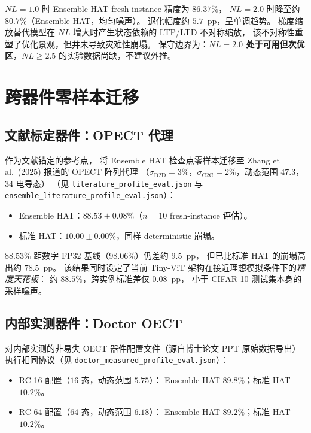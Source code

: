 $NL=1.0$ 时 Ensemble HAT fresh-instance 精度为 $86.37\%$，
$NL=2.0$ 时降至约 $80.7\%$（Ensemble HAT，均匀噪声）。
退化幅度约 $5.7$~pp，呈单调趋势。
梯度缩放替代模型在 $NL$ 增大时产生状态依赖的 LTP/LTD 不对称缩放，
该不对称性重塑了优化景观，但并未导致灾难性崩塌。
保守边界为：\textbf{$NL=2.0$ 处于可用但次优区}，$NL \ge 2.5$ 的实验数据尚缺，不建议外推。


\section{跨器件零样本迁移}
\label{sec:cross-device-transfer}

\subsection{文献标定器件：OPECT 代理}

作为文献锚定的参考点，
将 Ensemble HAT 检查点零样本迁移至 Zhang et al.~(2025) 报道的 OPECT 阵列代理
（$\sigma_{\mathrm{D2D}}=3\%$，$\sigma_{\mathrm{C2C}}=2\%$，动态范围 $47.3$，$34$ 电导态）
（见 \texttt{literature\_profile\_eval.json} 与 \texttt{ensemble\_literature\_profile\_eval.json}）：
\begin{itemize}
    \item Ensemble HAT：$\mathbf{88.53\pm0.08\%}$（$n=10$ fresh-instance 评估）。
    \item 标准 HAT：$\mathbf{10.00\pm0.00\%}$，同样 deterministic 崩塌。
\end{itemize}

$88.53\%$ 距数字 FP32 基线（$98.06\%$）仍差约 $9.5$~pp，
但已比标准 HAT 的崩塌高出约 $78.5$~pp。
该结果同时设定了当前 Tiny-ViT 架构在接近理想模拟条件下的\emph{精度天花板}：
约 $88.5\%$，跨实例标准差仅 $0.08$~pp，
小于 CIFAR-10 测试集本身的采样噪声。

\subsection{内部实测器件：Doctor OECT}

对内部实测的非易失 OECT 器件配置文件（源自博士论文 PPT 原始数据导出）
执行相同协议（见 \texttt{doctor\_measured\_profile\_eval.json}）：
\begin{itemize}
    \item RC-16 配置（$16$ 态，动态范围 $5.75$）：
    Ensemble HAT $89.8\%$；标准 HAT $10.2\%$。
    \item RC-64 配置（$64$ 态，动态范围 $6.18$）：
    Ensemble HAT $89.2\%$；标准 HAT $10.2\%$。
\end{itemize}


